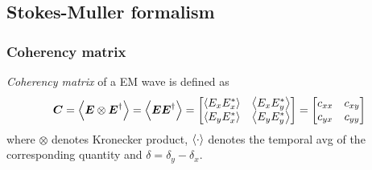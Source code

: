 \documentclass[11pt,a4paper]{article}
\numberwithin{equation}{section}
\begin{document}
\subsection{Stokes-Muller formalism}
\subsubsection{Coherency matrix}
\textit{Coherency matrix} of a EM wave is defined as \cite{WO} 
\begin{align}
	\boldsymbol{C}=\expval{\boldsymbol{E}\otimes\boldsymbol{E}^\dagger}= \expval{\boldsymbol{E}\boldsymbol{E}^\dagger}=
	\begin{bmatrix}
		\expval{E_xE_x^\ast} & \expval{E_xE_y^\ast}\\
		\expval{E_yE_x^\ast} & \expval{E_yE_y^\ast}
	\end{bmatrix}=
\begin{bmatrix}
	c_{xx} & c_{xy}\\
	c_{yx} & c_{yy}
\end{bmatrix}\label{coherency matrix}
\end{align}
where $\otimes$ denotes Kronecker product, $\expval{\cdot}$ denotes the temporal avg of the corresponding quantity and $\delta= \delta_y-\delta_x$.
\end{document}
